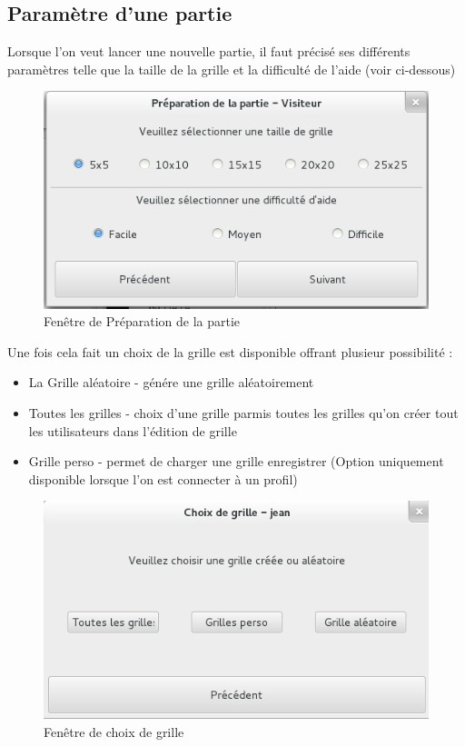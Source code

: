 \documentclass[11pt]{article}
\begin{document}
\subsection{Paramètre d'une partie}

Lorsque l'on veut lancer une nouvelle partie, il faut précisé ses différents paramètres telle que la taille de la grille et la difficulté de l'aide (voir ci-dessous)

	\begin{figure}[!ht]
		\centering
		\includegraphics{./Screenshot/PrepaPartie.png}
		\caption{Fenêtre de Préparation de la partie}
	\end{figure}


Une fois cela fait un choix de la grille est disponible offrant plusieur possibilité :
	
	\begin{itemize}
		\item La Grille aléatoire - génére une grille aléatoirement
		\item Toutes les grilles - choix d'une grille parmis toutes les grilles qu'on créer tout les utilisateurs dans l'édition de grille
		\item Grille perso - permet de charger une grille enregistrer (Option uniquement disponible lorsque l'on est connecter à un profil)
	\end{itemize}

	\begin{figure}[!ht]
		\centering
		\includegraphics{./Screenshot/ChoixGrille.png}
		\caption{Fenêtre de choix de grille}
	\end{figure}
\end{document}
